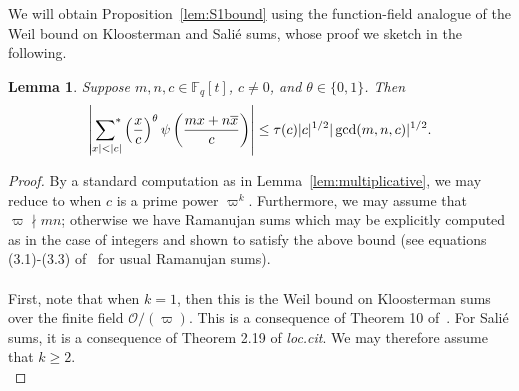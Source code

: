 \documentclass[10pt]{amsart}
\theoremstyle{plain}
\theoremstyle{plain}
\newtheorem{lemma}[theorem]{Lemma}
\theoremstyle{remark}
\theoremstyle{definition}
\newcommand{\sumstar}{\sideset{}{^*}\sum}
\begin{document}
We will obtain Proposition~\ref{lem:S1bound} using the function-field analogue of the Weil bound on Kloosterman and Sali\'e sums, whose proof we sketch in the following.
\begin{lemma}\label{Weilbound}Suppose $m,n,c\in\mathbb{F}_q[t]$, $c\neq 0$, and $\theta\in\{0,1\}$. Then
\[\left|\sumstar_{|x|<|c|}\left(\frac{x}{c}\right)^{\theta}\psi\left(\frac{mx+n\overline{x}}{c}\right)\right|\leq \tau(c)|c|^{1/2}|\gcd(m,n,c)|^{1/2}.\]
\end{lemma}
\begin{proof}
By a standard computation as in Lemma~\ref{lem:multiplicative}, we may reduce to when $c$ is a prime power $\varpi^{k}$. Furthermore, we may assume that $\varpi\nmid mn$; otherwise we have Ramanujan sums which may be explicitly computed as in the case of integers and shown to satisfy the above bound (see equations (3.1)-(3.3) of~\cite{MR2061214} for usual Ramanujan sums).\\
\\
First, note that when $k=1$, then this is the Weil bound on Kloosterman sums over the finite field $\mathcal{O}/(\varpi)$. This is a consequence of Theorem 10 of~\cite{Kowalski:expsums}. For Sali\'e sums, it is a consequence of Theorem 2.19 of \textit{loc.cit}. We may therefore assume that $k\geq 2$.\\


\end{proof}
\end{document}
